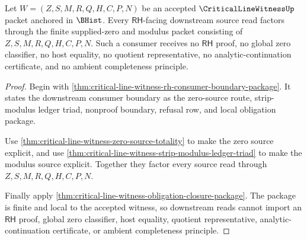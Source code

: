 \begin{theorem}
\label{thm:critical-line-witness-downstream-source-obligation}
Let $W=(Z,S,M,R,Q,H,C,P,N)$ be an accepted $\CriticalLineWitnessUp$ packet anchored in $\BHist$. Every $\mathsf{RH}$-facing downstream source read factors through the finite supplied-zero and modulus packet consisting of $Z,S,M,R,Q,H,C,P,N$. Such a consumer receives no $\mathsf{RH}$ proof, no global zero classifier, no host equality, no quotient representative, no analytic-continuation certificate, and no ambient completeness principle.
\end{theorem}
\begin{proof}
Begin with \autoref{thm:critical-line-witness-rh-consumer-boundary-package}. It states the downstream consumer boundary as the zero-source route, strip-modulus ledger triad, nonproof boundary, refusal row, and local obligation package.

Use \autoref{thm:critical-line-witness-zero-source-totality} to make the zero source explicit, and use \autoref{thm:critical-line-witness-strip-modulus-ledger-triad} to make the modulus source explicit. Together they factor every source read through $Z,S,M,R,Q,H,C,P,N$.

Finally apply \autoref{thm:critical-line-witness-obligation-closure-package}. The package is finite and local to the accepted witness, so downstream reads cannot import an $\mathsf{RH}$ proof, global zero classifier, host equality, quotient representative, analytic-continuation certificate, or ambient completeness principle.
\end{proof}

